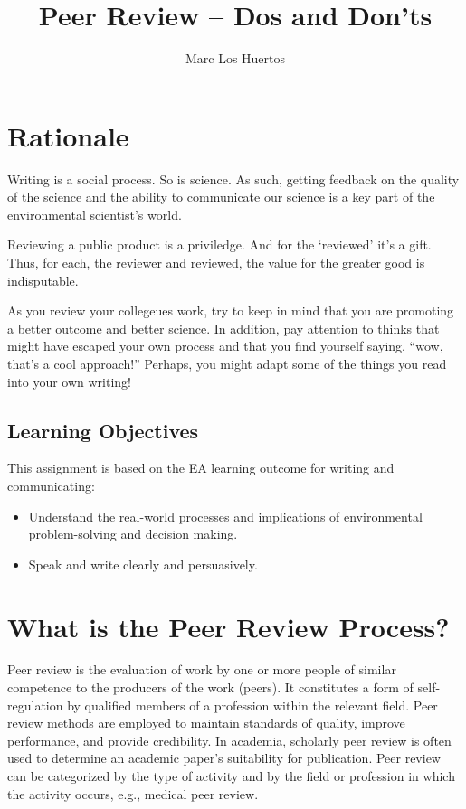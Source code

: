 \documentclass{tufte-handout}\usepackage[]{graphicx}\usepackage[]{color}
\title{Peer Review -- Dos and Don'ts %
}
\author[Marc Los Huertos]{Marc Los Huertos}
\begin{document}
\maketitle

\section{Rationale}

Writing is a social process. So is science. As such, getting feedback on the quality of the science and the ability to communicate our science is a key part of the environmental scientist's world. 

Reviewing a public product is a priviledge. And for the `reviewed' it's a gift. Thus, for each, the reviewer and reviewed, the value for the greater good is indisputable. 

As you review your collegeues work, try to keep in mind that you are promoting a better outcome and better science. In addition, pay attention to thinks that might have escaped your own process and that you find yourself saying, ``wow, that's a cool approach!''  Perhaps, you might adapt some of the things you read into your own writing!

\subsection{Learning Objectives}

This assignment is based on the EA learning outcome for writing and communicating: 

\begin{itemize}
	\item Understand the real-world processes and implications of environmental problem-solving and decision making.
	\item Speak and write clearly and persuasively.
\end{itemize}

\section{What is the Peer Review Process?}

Peer review is the evaluation of work by one or more people of similar competence to the producers of the work (peers). It constitutes a form of self-regulation by qualified members of a profession within the relevant field. Peer review methods are employed to maintain standards of quality, improve performance, and provide credibility. In academia, scholarly peer review is often used to determine an academic paper's suitability for publication. Peer review can be categorized by the type of activity and by the field or profession in which the activity occurs, e.g., medical peer review.
\end{document}
